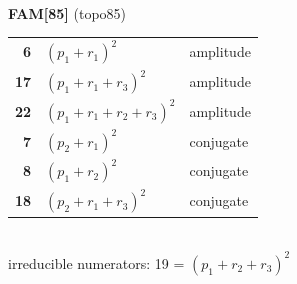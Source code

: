 \documentclass[10pt]{article}
\begin{document}
\begin{minipage}[t]{0.48\textwidth}
{}\\[2mm]\textbf{FAM[85]} (topo85)\\[2pt]{\footnotesize\begin{tabular}{@{}r@{\ \ }l@{\ \ }l@{}}\textbf{6} & $(p_1+r_1)^2$ & amplitude\\
\textbf{17} & $(p_1+r_1+r_3)^2$ & amplitude\\
\textbf{22} & $(p_1+r_1+r_2+r_3)^2$ & amplitude\\
\textbf{7} & $(p_2+r_1)^2$ & conjugate\\
\textbf{8} & $(p_1+r_2)^2$ & conjugate\\
\textbf{18} & $(p_2+r_1+r_3)^2$ & conjugate\\\end{tabular}}\\[2pt]{\scriptsize irreducible numerators: 19 = $(p_1+r_2+r_3)^2$}\end{minipage}\hfill%
\end{document}

